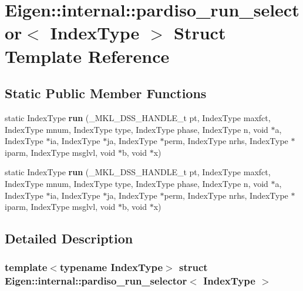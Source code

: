 \hypertarget{struct_eigen_1_1internal_1_1pardiso__run__selector}{}\section{Eigen\+:\+:internal\+:\+:pardiso\+\_\+run\+\_\+selector$<$ Index\+Type $>$ Struct Template Reference}
\label{struct_eigen_1_1internal_1_1pardiso__run__selector}
\subsection*{Static Public Member Functions}
\begin{DoxyCompactItemize}
\item 
\mbox{\label{struct_eigen_1_1internal_1_1pardiso__run__selector_ab9b3df198fa7a73ed2fd7b3a968060a2}} 
static Index\+Type {\bfseries run} (\+\_\+\+M\+K\+L\+\_\+\+D\+S\+S\+\_\+\+H\+A\+N\+D\+L\+E\+\_\+t pt, Index\+Type maxfct, Index\+Type mnum, Index\+Type type, Index\+Type phase, Index\+Type n, void $\ast$a, Index\+Type $\ast$ia, Index\+Type $\ast$ja, Index\+Type $\ast$perm, Index\+Type nrhs, Index\+Type $\ast$iparm, Index\+Type msglvl, void $\ast$b, void $\ast$x)
\item 
\mbox{\label{struct_eigen_1_1internal_1_1pardiso__run__selector_ab9b3df198fa7a73ed2fd7b3a968060a2}} 
static Index\+Type {\bfseries run} (\+\_\+\+M\+K\+L\+\_\+\+D\+S\+S\+\_\+\+H\+A\+N\+D\+L\+E\+\_\+t pt, Index\+Type maxfct, Index\+Type mnum, Index\+Type type, Index\+Type phase, Index\+Type n, void $\ast$a, Index\+Type $\ast$ia, Index\+Type $\ast$ja, Index\+Type $\ast$perm, Index\+Type nrhs, Index\+Type $\ast$iparm, Index\+Type msglvl, void $\ast$b, void $\ast$x)
\end{DoxyCompactItemize}


\subsection{Detailed Description}
\subsubsection*{template$<$typename Index\+Type$>$\newline
struct Eigen\+::internal\+::pardiso\+\_\+run\+\_\+selector$<$ Index\+Type $>$}




